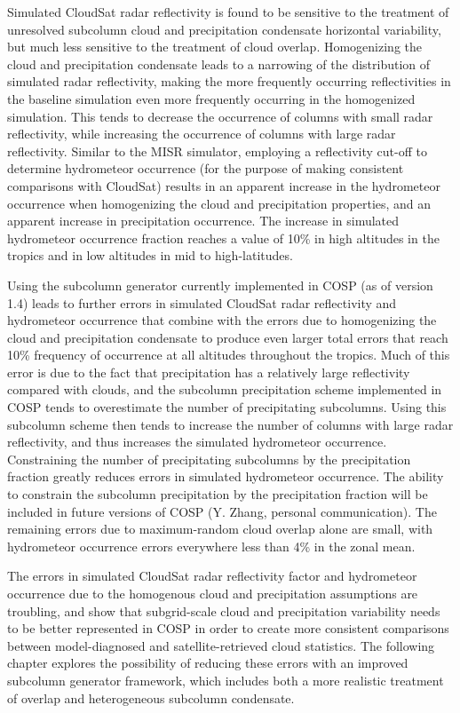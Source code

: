 Simulated CloudSat radar reflectivity is found to be sensitive to the
treatment of unresolved subcolumn cloud and precipitation condensate
horizontal variability, but much less sensitive to the treatment of
cloud overlap. Homogenizing the cloud and precipitation condensate leads
to a narrowing of the distribution of simulated radar reflectivity,
making the more frequently occurring reflectivities in the baseline
simulation even more frequently occurring in the homogenized simulation.
This tends to decrease the occurrence of columns with small radar
reflectivity, while increasing the occurrence of columns with large
radar reflectivity. Similar to the MISR simulator, employing a
reflectivity cut-off to determine hydrometeor occurrence (for the
purpose of making consistent comparisons with CloudSat) results in an
apparent increase in the hydrometeor occurrence when homogenizing the
cloud and precipitation properties, and an apparent increase in
precipitation occurrence. The increase in simulated hydrometeor
occurrence fraction reaches a value of 10\% in high altitudes in the
tropics and in low altitudes in mid to high-latitudes.

Using the subcolumn generator currently implemented in COSP (as of
version 1.4) leads to further errors in simulated CloudSat radar
reflectivity and hydrometeor occurrence that combine with the errors due
to homogenizing the cloud and precipitation condensate to produce even
larger total errors that reach 10\% frequency of occurrence at all
altitudes throughout the tropics. Much of this error is due to the fact
that precipitation has a relatively large reflectivity compared with
clouds, and the subcolumn precipitation scheme implemented in COSP tends
to overestimate the number of precipitating subcolumns. Using this
subcolumn scheme then tends to increase the number of columns with large
radar reflectivity, and thus increases the simulated hydrometeor
occurrence. Constraining the number of precipitating subcolumns by the
precipitation fraction greatly reduces errors in simulated hydrometeor
occurrence. The ability to constrain the subcolumn precipitation by the
precipitation fraction will be included in future versions of COSP (Y.
Zhang, personal communication). The remaining errors due to
maximum-random cloud overlap alone are small, with hydrometeor
occurrence errors everywhere less than 4\% in the zonal mean.

The errors in simulated CloudSat radar reflectivity factor and
hydrometeor occurrence due to the homogenous cloud and precipitation
assumptions are troubling, and show that subgrid-scale cloud and
precipitation variability needs to be better represented in COSP in
order to create more consistent comparisons between model-diagnosed and
satellite-retrieved cloud statistics. The following chapter explores the
possibility of reducing these errors with an improved subcolumn
generator framework, which includes both a more realistic treatment of
overlap and heterogeneous subcolumn condensate.
